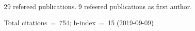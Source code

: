 29 refereed publications. 9 refeered publications as first author.

Total citations~=~754; h-index~=~15 (2019-09-09)